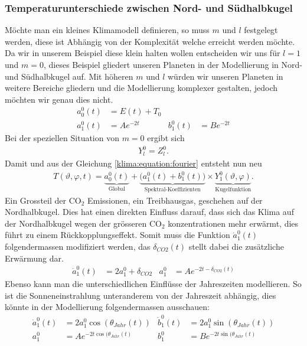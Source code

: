 \begin{refsection}
\subsubsection{Temperaturunterschiede zwischen Nord- und Südhalbkugel
\label{klima:subsubsection:halbkugel}}
Möchte man ein kleines Klimamodell definieren, so muss  $m$ und $l$ festgelegt werden, diese ist Abhängig von der Komplexität welche erreicht werden möchte. Da wir in unserem Beispiel diese klein halten wollen entscheiden wir uns für $l=1$ und $m=0$, dieses Beispiel gliedert unseren Planeten in der Modellierung in Nord- und Südhalbkugel auf. Mit höheren $m$ und $l$ würden wir unseren Planeten in weitere Bereiche gliedern und die Modellierung komplexer gestalten, jedoch möchten wir genau dies nicht.
\begin{align*}
a^0_0(t)&=E(t)+T_0
\\
a^0_1(t) &=Ae^{-2t}&
b^0_1(t) &=Be^{-2t}
\end{align*}
Bei der speziellen Situation von $m=0$ ergibt sich
\begin{align*}
Y^0_l=Z^0_l.
\end{align*}
Damit und aus der Gleichung \eqref{klima:equation:fourier} entsteht nun neu
\begin{align}
T(\vartheta ,\varphi ,t)
=
\underbrace{a^0_0(t)}_{\text{Global}} + \underbrace{\bigl( a^0_1(t)+b^0_1(t) \bigr)}_{\text{Spektral-Koeffizienten}} \times \underbrace{Y^0_1(\vartheta ,\varphi)}_{\text{Kugelfunktion}}.
\end{align}
Ein Grossteil der CO$_2$ Emissionen, ein Treibhausgas, geschehen auf der Nordhalbkugel. Dies hat einen direkten Einfluss darauf, dass sich das Klima auf der Nordhalbkugel wegen der grösseren CO$_2$ konzentrationen mehr erwärmt, dies führt zu einem Rückkopplungseffekt. Somit muss die Funktion $\dot a^0_1(t)$ folgendermassen modifiziert werden, das $\delta_{CO2}(t)$ stellt dabei die zusätzliche Erwärmung dar.
\begin{align*}
\dot a^0_1(t) &= 2a_1^0+\delta_{CO2} &
a_1^0 &= Ae^{-2t-\delta_{CO2}(t)}
\end{align*}
Ebenso kann man die unterschiedlichen Einflüsse der Jahreszeiten modellieren. So ist die Sonneneinstrahlung unteranderem von der Jahreszeit abhängig, dies könnte in der Modellierung folgendermassen ausschauen:
\begin{align*}
\dot a_1^0(t) &= 2a_1^0 \cos(\theta_{Jahr}(t)) &
\dot b_1^0(t) &= 2a_1^0 \sin(\theta_{Jahr}(t))
\\
a_1^0 &= Ae^{-2t \cos(\theta_{Jahr}(t)} &
b_1^0 &= Be^{-2t \sin(\theta_{Jahr}(t)}
\end{align*}



\end{refsection}
